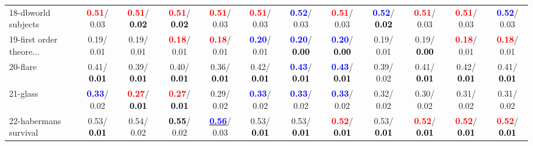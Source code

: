 \begin{table}[h]
\begin{center}
{\begin{tabular}{lc|c|c|c|c|c|c|c|c|c|c}
18-dbworld subjects & \textcolor{red}{\textbf{  0.51}}/  0.03 & \textcolor{red}{\textbf{  0.51}}/\textcolor{black}{\textbf{  0.02}} & \textcolor{red}{\textbf{  0.51}}/\textcolor{black}{\textbf{  0.02}} & \textcolor{red}{\textbf{  0.51}}/  0.03 & \textcolor{red}{\textbf{  0.51}}/  0.03 & \textcolor{blue}{\textbf{  0.52}}/  0.03 & \textcolor{red}{\textbf{  0.51}}/  0.03 & \textcolor{blue}{\textbf{  0.52}}/\textcolor{black}{\textbf{  0.02}} & \textcolor{red}{\textbf{  0.51}}/  0.03 & \textcolor{red}{\textbf{  0.51}}/  0.03 & \textcolor{blue}{\textbf{  0.52}}/  0.03 \\
19-first order theore... &   0.19/  0.01 &   0.19/  0.01 & \textcolor{red}{\textbf{  0.18}}/  0.01 & \textcolor{red}{\textbf{  0.18}}/  0.01 & \textcolor{blue}{\textbf{  0.20}}/  0.01 & \textcolor{blue}{\textbf{  0.20}}/\textcolor{black}{\textbf{  0.00}} & \textcolor{blue}{\textbf{  0.20}}/\textcolor{black}{\textbf{  0.00}} &   0.19/  0.01 &   0.19/\textcolor{black}{\textbf{  0.00}} & \textcolor{red}{\textbf{  0.18}}/  0.01 & \textcolor{red}{\textbf{  0.18}}/  0.01 \\
20-flare &   0.41/\textcolor{black}{\textbf{  0.01}} &   0.39/\textcolor{black}{\textbf{  0.01}} &   0.40/\textcolor{black}{\textbf{  0.01}} &   0.36/\textcolor{black}{\textbf{  0.01}} &   0.42/\textcolor{black}{\textbf{  0.01}} & \textcolor{blue}{\textbf{  0.43}}/\textcolor{black}{\textbf{  0.01}} & \textcolor{blue}{\textbf{  0.43}}/\textcolor{black}{\textbf{  0.01}} &   0.39/  0.02 &   0.41/\textcolor{black}{\textbf{  0.01}} &   0.42/\textcolor{black}{\textbf{  0.01}} &   0.41/\textcolor{black}{\textbf{  0.01}} \\
21-glass & \textcolor{blue}{\textbf{  0.33}}/  0.02 & \textcolor{red}{\textbf{  0.27}}/\textcolor{black}{\textbf{  0.01}} & \textcolor{red}{\textbf{  0.27}}/\textcolor{black}{\textbf{  0.01}} &   0.29/  0.02 & \textcolor{blue}{\textbf{  0.33}}/  0.02 & \textcolor{blue}{\textbf{  0.33}}/  0.02 & \textcolor{blue}{\textbf{  0.33}}/  0.02 &   0.32/  0.02 &   0.30/  0.02 &   0.31/  0.02 &   0.31/  0.02 \\ \hline
22-habermans survival &   0.53/\textcolor{black}{\textbf{  0.01}} &   0.54/  0.02 & \textcolor{black}{\textbf{  0.55}}/  0.02 & \underline{\textcolor{blue}{\textbf{  0.56}}}/  0.03 &   0.53/\textcolor{black}{\textbf{  0.01}} &   0.53/\textcolor{black}{\textbf{  0.01}} & \textcolor{red}{\textbf{  0.52}}/\textcolor{black}{\textbf{  0.01}} &   0.53/\textcolor{black}{\textbf{  0.01}} & \textcolor{red}{\textbf{  0.52}}/\textcolor{black}{\textbf{  0.01}} & \textcolor{red}{\textbf{  0.52}}/\textcolor{black}{\textbf{  0.01}} & \textcolor{red}{\textbf{  0.52}}/\textcolor{black}{\textbf{  0.01}} \\

\end{tabular}}
\end{center}
\end{table}
